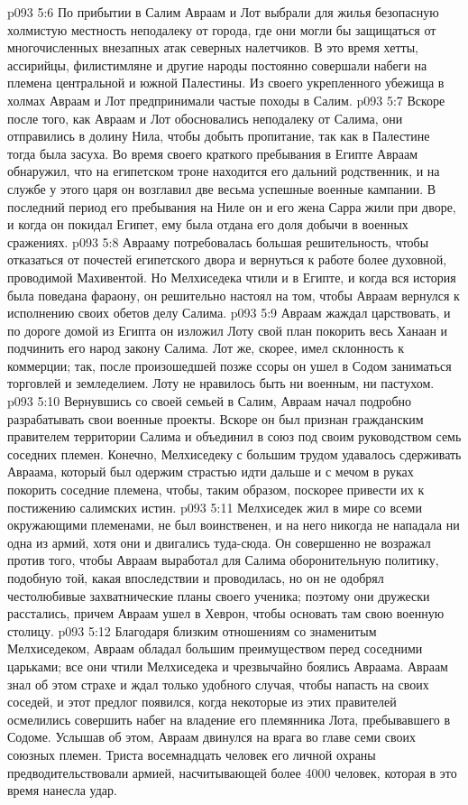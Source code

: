 \vs p093 5:6 По прибытии в Салим Авраам и Лот выбрали для жилья безопасную холмистую местность неподалеку от города, где они могли бы защищаться от многочисленных внезапных атак северных налетчиков. В это время хетты, ассирийцы, филистимляне и другие народы постоянно совершали набеги на племена центральной и южной Палестины. Из своего укрепленного убежища в холмах Авраам и Лот предпринимали частые походы в Салим.
\vs p093 5:7 \pc Вскоре после того, как Авраам и Лот обосновались неподалеку от Салима, они отправились в долину Нила, чтобы добыть пропитание, так как в Палестине тогда была засуха. Во время своего краткого пребывания в Египте Авраам обнаружил, что на египетском троне находится его дальний родственник, и на службе у этого царя он возглавил две весьма успешные военные кампании. В последний период его пребывания на Ниле он и его жена Сарра жили при дворе, и когда он покидал Египет, ему была отдана его доля добычи в военных сражениях.
\vs p093 5:8 Аврааму потребовалась большая решительность, чтобы отказаться от почестей египетского двора и вернуться к работе более духовной, проводимой Махивентой. Но Мелхиседека чтили и в Египте, и когда вся история была поведана фараону, он решительно настоял на том, чтобы Авраам вернулся к исполнению своих обетов делу Салима.
\vs p093 5:9 \pc Авраам жаждал царствовать, и по дороге домой из Египта он изложил Лоту свой план покорить весь Ханаан и подчинить его народ закону Салима. Лот же, скорее, имел склонность к коммерции; так, после произошедшей позже ссоры он ушел в Содом заниматься торговлей и земледелием. Лоту не нравилось быть ни военным, ни пастухом.
\vs p093 5:10 Вернувшись со своей семьей в Салим, Авраам начал подробно разрабатывать свои военные проекты. Вскоре он был признан гражданским правителем территории Салима и объединил в союз под своим руководством семь соседних племен. Конечно, Мелхиседеку с большим трудом удавалось сдерживать Авраама, который был одержим страстью идти дальше и с мечом в руках покорить соседние племена, чтобы, таким образом, поскорее привести их к постижению салимских истин.
\vs p093 5:11 Мелхиседек жил в мире со всеми окружающими племенами, не был воинственен, и на него никогда не нападала ни одна из армий, хотя они и двигались туда\hyp{}сюда. Он совершенно не возражал против того, чтобы Авраам выработал для Салима оборонительную политику, подобную той, какая впоследствии и проводилась, но он не одобрял честолюбивые захватнические планы своего ученика; поэтому они дружески расстались, причем Авраам ушел в Хеврон, чтобы основать там свою военную столицу.
\vs p093 5:12 Благодаря близким отношениям со знаменитым Мелхиседеком, Авраам обладал большим преимуществом перед соседними царьками; все они чтили Мелхиседека и чрезвычайно боялись Авраама. Авраам знал об этом страхе и ждал только удобного случая, чтобы напасть на своих соседей, и этот предлог появился, когда некоторые из этих правителей осмелились совершить набег на владение его племянника Лота, пребывавшего в Содоме. Услышав об этом, Авраам двинулся на врага во главе семи своих союзных племен. Триста восемнадцать человек его личной охраны предводительствовали армией, насчитывающей более 4000 человек, которая в это время нанесла удар.
